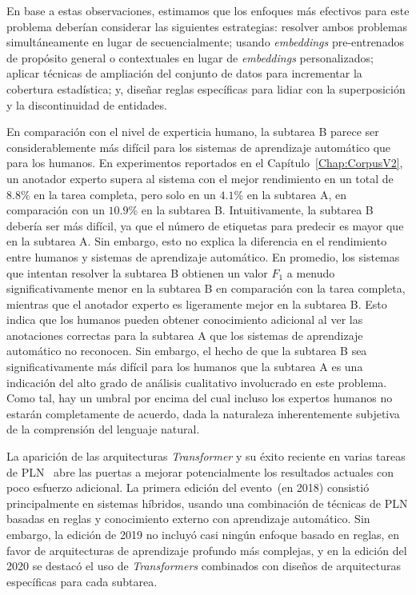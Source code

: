 En base a estas observaciones, estimamos que los enfoques más efectivos para este problema deberían considerar las siguientes estrategias:
resolver ambos problemas simultáneamente en lugar de secuencialmente; usando \textit{embeddings} pre-entrenados de propósito general o contextuales en lugar de \textit{embeddings} personalizados; aplicar técnicas de ampliación del conjunto de datos para incrementar la cobertura estadística; y, diseñar reglas específicas para lidiar con la superposición y la discontinuidad de entidades.

En comparación con el nivel de experticia humano, la subtarea B parece ser considerablemente más difícil para los sistemas de aprendizaje automático que para los humanos. En experimentos reportados en el Capítulo~\ref{Chap:CorpusV2}, un anotador experto supera al sistema con el mejor rendimiento en un total de $8.8$\% en la tarea completa, pero solo en un $4.1$\% en la subtarea A, en comparación con un $10.9$\% en la subtarea B. Intuitivamente, la subtarea B debería ser más difícil, ya que el número de etiquetas para predecir es mayor que en la subtarea A. Sin embargo, esto no explica la diferencia en el rendimiento entre humanos
y sistemas de aprendizaje automático. En promedio, los sistemas que intentan resolver la subtarea B obtienen un valor $F_1$ a menudo significativamente menor en la subtarea B en comparación con la tarea completa, mientras que el anotador experto es ligeramente mejor en la subtarea B. Esto indica que los humanos pueden obtener conocimiento adicional al ver las anotaciones correctas para la subtarea A que los sistemas de aprendizaje automático no reconocen.
Sin embargo, el hecho de que la subtarea B sea significativamente más difícil para los humanos que la subtarea A es una indicación del alto grado de análisis cualitativo involucrado en este problema. Como tal, hay un umbral por encima del cual incluso los expertos humanos no estarán completamente de acuerdo, dada la naturaleza inherentemente subjetiva de la comprensión del lenguaje natural.

La aparición de las arquitecturas \textit{Transformer} y su éxito reciente en varias tareas de PLN~\cite{bert} abre las puertas a mejorar potencialmente los resultados actuales con poco esfuerzo adicional. La primera edición del evento~(en 2018) consistió principalmente en sistemas híbridos, usando una combinación de técnicas de PLN basadas en reglas y conocimiento externo con aprendizaje automático. Sin embargo, la edición de 2019 no incluyó casi ningún enfoque basado en reglas, en favor de arquitecturas de aprendizaje profundo más complejas, y en la edición del 2020 se destacó el uso de \textit{Transformers} combinados con diseños de arquitecturas específicas para cada subtarea.

